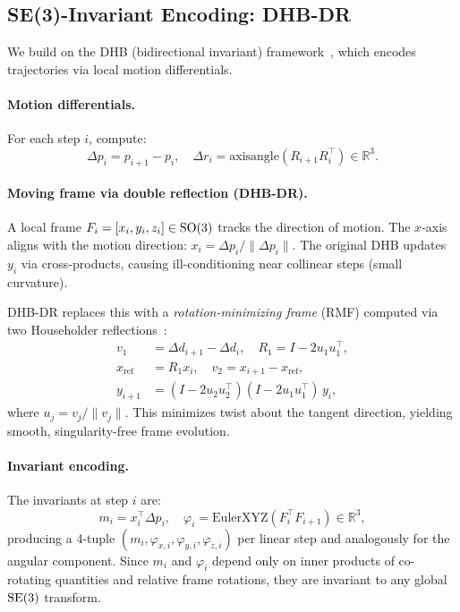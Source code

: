 \subsection{SE(3)-Invariant Encoding: DHB-DR}
\label{sec:dhb_dr}

We build on the DHB (bidirectional invariant) framework~\cite{soloperto2015,lee2018},
which encodes trajectories via local motion differentials.

\paragraph{Motion differentials.}
For each step $i$, compute:
\begin{equation}
\Delta p_i = p_{i+1} - p_i, \quad
\Delta r_i = \mathrm{axisangle}(R_{i+1} R_i^\top) \in \mathbb{R}^3.
\end{equation}

\paragraph{Moving frame via double reflection (DHB-DR).}
A local frame $F_i = [x_i, y_i, z_i] \in \mathrm{SO}(3)$ tracks the direction of motion.
The $x$-axis aligns with the motion direction: $x_i = \Delta p_i / \|\Delta p_i\|$.
The original DHB updates $y_i$ via cross-products, causing ill-conditioning
near collinear steps (small curvature).

DHB-DR replaces this with a \emph{rotation-minimizing frame} (RMF) computed
via two Householder reflections~\cite{wang2008rmf}:
\begin{align}
v_1 &= \Delta d_{i+1} - \Delta d_i, \quad R_1 = I - 2u_1u_1^\top, \\
x_\mathrm{ref} &= R_1 x_i, \quad v_2 = x_{i+1} - x_\mathrm{ref}, \\
y_{i+1} &= (I - 2u_2u_2^\top)(I - 2u_1u_1^\top)\, y_i,
\end{align}
where $u_j = v_j / \|v_j\|$. This minimizes twist about the tangent direction,
yielding smooth, singularity-free frame evolution.

\paragraph{Invariant encoding.}
The invariants at step $i$ are:
\begin{equation}
m_i = x_i^\top \Delta p_i, \quad
\varphi_i = \mathrm{EulerXYZ}(F_i^\top F_{i+1}) \in \mathbb{R}^3,
\end{equation}
producing a 4-tuple $(m_i, \varphi_{x,i}, \varphi_{y,i}, \varphi_{z,i})$
per linear step and analogously for the angular component.
Since $m_i$ and $\varphi_i$ depend only on inner products of co-rotating quantities
and relative frame rotations, they are invariant to any global $\mathrm{SE}(3)$ transform.

